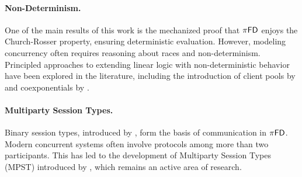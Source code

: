 \paragraph{Non-Determinism.}
One of the main results of this work is the mechanized proof that $\pi\textsf{FD}$
enjoys the Church-Rosser property, ensuring deterministic evaluation.
However, modeling concurrency often requires reasoning about races and non-determinism.
Principled approaches to extending linear logic with non-deterministic behavior
have been explored in the literature, including the introduction of client pools
by \citet{Kokke2019:RacesInLinearLogic} and coexponentials by \citet{Qian2021:CoExponentials}.

\paragraph{Multiparty Session Types.}
Binary session types, introduced by \citet{Honda1993:TypesForDyadicInteraction}, form the basis of communication in $\pi\textsf{FD}$.
Modern concurrent systems often involve protocols among more than two participants.
This has led to the development of Multiparty Session Types (MPST)
introduced by \citet{Honda2008:MPST}, which remains an active area of research.
